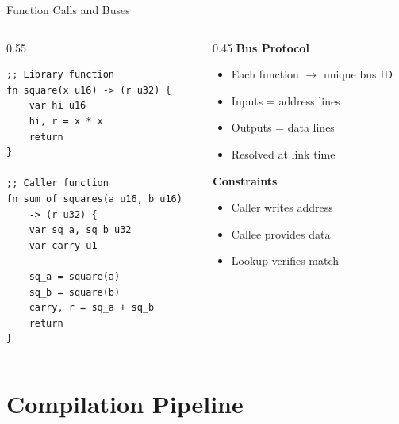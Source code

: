 \documentclass[aspectratio=169,11pt]{beamer}
\begin{document}
\begin{frame}[fragile]{Function Calls and Buses}

\begin{columns}
\begin{column}{0.55\textwidth}
\begin{lstlisting}[style=zkasm]
;; Library function
fn square(x u16) -> (r u32) {
    var hi u16
    hi, r = x * x
    return
}

;; Caller function
fn sum_of_squares(a u16, b u16)
    -> (r u32) {
    var sq_a, sq_b u32
    var carry u1

    sq_a = square(a)
    sq_b = square(b)
    carry, r = sq_a + sq_b
    return
}
\end{lstlisting}
\end{column}

\begin{column}{0.45\textwidth}
\textbf{Bus Protocol}
\begin{itemize}
    \item Each function $\to$ unique bus ID
    \item Inputs = address lines
    \item Outputs = data lines
    \item Resolved at link time
\end{itemize}

\vspace{0.5em}
\textbf{Constraints}
\begin{itemize}
    \item Caller writes address
    \item Callee provides data
    \item Lookup verifies match
\end{itemize}
\end{column}
\end{columns}
\end{frame}

\section{Compilation Pipeline}
\end{document}
